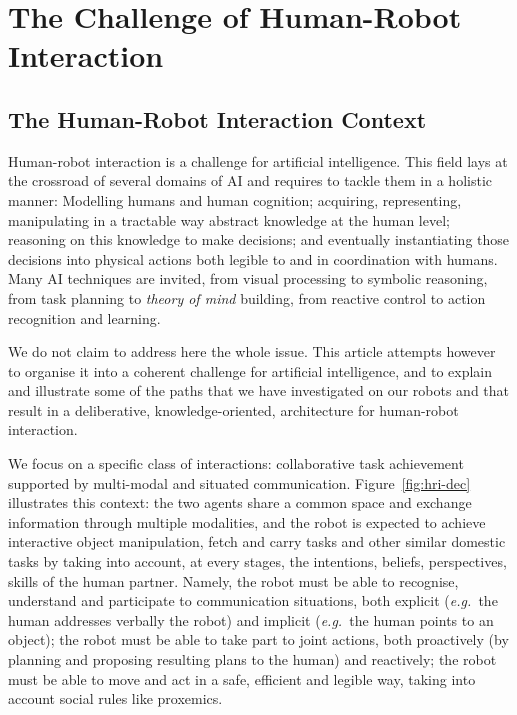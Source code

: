 \documentclass[preprint,3p,times]{elsarticle}
\newcommand{\eg}{{\textit{e.g.\ }}}
\begin{document}

\section{The Challenge of Human-Robot Interaction}

\subsection{The Human-Robot Interaction Context}

Human-robot interaction is a challenge for artificial intelligence. This field
lays at the crossroad of several domains of AI and requires to tackle them in a
holistic manner: Modelling humans and human cognition; acquiring, representing,
manipulating in a tractable way abstract knowledge at the human level; reasoning
on this knowledge to make decisions; and eventually instantiating those
decisions into physical actions both legible to and in coordination with humans.
Many AI techniques are invited, from visual processing to symbolic reasoning,
from task planning to \emph{theory of mind} building, from reactive control to
action recognition and learning.

We do not claim to address here the whole issue. This article attempts however to organise
it into a coherent challenge for artificial intelligence, and to explain and
illustrate some of the paths that we have investigated on our robots and that
result in a deliberative, knowledge-oriented, architecture for human-robot
interaction.

We focus on a specific class of interactions: collaborative task achievement
supported by multi-modal and situated communication. Figure~\ref{fig:hri-dec}
illustrates this context: the two agents share a common space and exchange
information through multiple modalities, and the robot is expected to achieve
interactive object manipulation, fetch and carry tasks and other similar
domestic tasks by taking into account, at every stages, the intentions, beliefs,
perspectives, skills of the human partner.  Namely, the robot must be able to
recognise, understand and participate to communication situations, both explicit
(\eg the human addresses verbally the robot) and implicit (\eg the human points
to an object); the robot must be able to take part to joint actions, both
proactively (by planning and proposing resulting plans to the human) and
reactively; the robot must be able to move and act in a safe, efficient and
legible way, taking into account social rules like proxemics.
\end{document}
